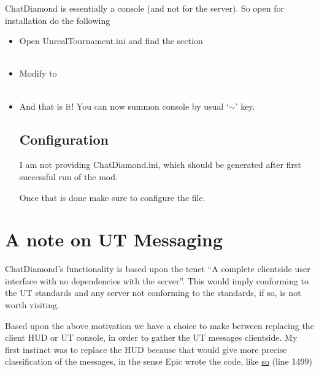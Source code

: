 \documentclass{article}
\begin{document}
ChatDiamond is essentially a console (and not for the server).  So open for installation do the following
\begin{itemize}
\item Open {\color{Purple}UnrealTournament.ini} and find the section \\

\\

\item Modify to \\

\\

\item And that is it!  You can now summon console by usual `$\sim$' key.

\subsection{Configuration}
I am not providing {\color{purple}ChatDiamond.ini}, which should be generated after first successful run of the mod.  

Once that is done make sure to configure the file.

\end{itemize}

\section{A note on UT Messaging}
ChatDiamond's functionality is based upon the tenet ``A complete clientside user interface with no dependencies with the server''.  This would imply conforming to the UT standards and any server not conforming to the standards, if so, is not worth visiting.

Based upon the above motivation we have a choice to make between replacing the client HUD or UT console, in order to gather the UT messages clientside.  My first instinct was to replace the HUD because that would give more precise classification of the messages, in the sense Epic wrote the code, like \href{http://uncodex.ut-files.com/UT/v436/Source_botpack/challengehud.html}{so} (line 1499)
\end{document}
